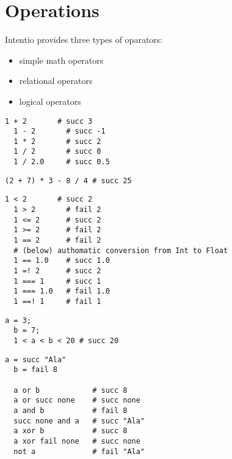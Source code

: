 \chapter{Operations}

Intentio provides three types of oparators:
\begin{itemize}
  \item simple math operators
  \item relational operators
  \item logical operators
\end{itemize}

\begin{example}
\begin{lstlisting}[language=intentio]
  1 + 2       # succ 3
  1 - 2       # succ -1
  1 * 2       # succ 2
  1 / 2       # succ 0
  1 / 2.0     # succ 0.5
\end{lstlisting}
\end{example}

\begin{example}
\begin{lstlisting}[language=intentio]
  (2 + 7) * 3 - 8 / 4 # succ 25
\end{lstlisting}
\end{example}

\clearpage
\begin{example}
\begin{lstlisting}[language=intentio]
  1 < 2       # succ 2
  1 > 2       # fail 2
  1 <= 2      # succ 2
  1 >= 2      # fail 2
  1 == 2      # fail 2
  # (below) authomatic conversion from Int to Float
  1 == 1.0    # succ 1.0
  1 =! 2      # succ 2
  1 === 1     # succ 1
  1 === 1.0   # fail 1.0
  1 ==! 1     # fail 1
\end{lstlisting}
\end{example}

\begin{example}
\begin{lstlisting}[language=intentio]
  a = 3;
  b = 7;
  1 < a < b < 20 # succ 20
\end{lstlisting}
\end{example}

\begin{example}
\begin{lstlisting}[language=intentio]
  a = succ "Ala"   
  b = fail 8

  a or b            # succ 8
  a or succ none    # succ none
  a and b           # fail 8
  succ none and a   # succ "Ala"
  a xor b           # succ 8
  a xor fail none   # succ none
  not a             # fail "Ala"
\end{lstlisting}
\end{example}
